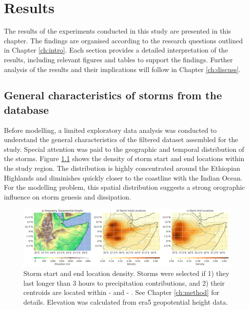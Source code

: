 \chapter{Results}
\label{ch:results}

The results of the experiments conducted in this study are presented in this chapter. The findings are organised according to the research questions outlined in Chapter \ref{ch:intro}. Each section provides a detailed interpretation of the results, including relevant figures and tables to support the findings. Further analysis of the results and their implications will follow in Chapter \ref{ch:discuss}.

\section{General characteristics of storms from the database}

Before modelling, a limited exploratory data analysis was conducted to understand the general characteristics of the filtered dataset assembled for the study. Special attention was paid to the geographic and temporal distribution of the storms. Figure \ref{fig:orography_storm_init_end_kde} shows the density of storm start and end locations within the study region. The distribution is highly concentrated around the Ethiopian Highlands and diminishes quickly closer to the coastline with the Indian Ocean. For the modelling problem, this spatial distribution suggests a strong orographic influence on storm genesis and dissipation.

\begin{figure}[ht]
    \centering
    \includegraphics[width=\textwidth]{../figures/generated/exploration/orography_storm_init_end_kde.png}
    \caption{Storm start and end location density. Storms were selected if 1) they last longer than 3 hours to precipitation contributions, and 2) their centroids are located within  -  and  -  \citep{Hill2023}. See Chapter \ref{ch:method} for details. Elevation was calculated from \acrshort{era5} geopotential height data.}
    \label{fig:orography_storm_init_end_kde}
\end{figure}


